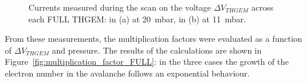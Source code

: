\documentclass[a4paper, 11 pt]{article}
\newcommand{\Vthgem}{$\Delta V_{THGEM}$}
\begin{document}
\begin{figure}[!htb]
	\centering
	\caption{Currents measured during the scan on the voltage \Vthgem{} across each FULL THGEM: in (a) at 20~mbar, in (b) at 11~mbar.}
	\label{fig:thgem_FULLTHGEM_other_pressure}
\end{figure}


From these measurements, the multiplication factors were evaluated as a function of \Vthgem{} and pressure.
The results of the calculations are shown in Figure~\ref{fig:multiplication_factor_FULL}: in the three cases the growth of the electron number in the avalanche follows an exponential behaviour.\\
\end{document}
